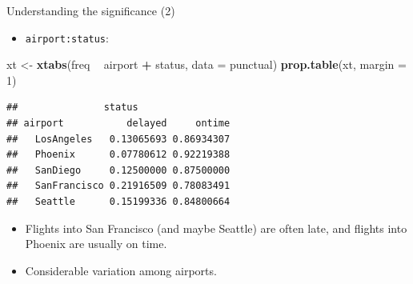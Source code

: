 \documentclass[
  ignorenonframetext,
]{beamer}
\newenvironment{Shaded}{\begin{snugshade}}{\end{snugshade}}
\newcommand{\DataTypeTok}[1]{\textcolor[rgb]{0.13,0.29,0.53}{#1}}
\newcommand{\DecValTok}[1]{\textcolor[rgb]{0.00,0.00,0.81}{#1}}
\newcommand{\KeywordTok}[1]{\textcolor[rgb]{0.13,0.29,0.53}{\textbf{#1}}}
\newcommand{\NormalTok}[1]{#1}
\newcommand{\OperatorTok}[1]{\textcolor[rgb]{0.81,0.36,0.00}{\textbf{#1}}}
\newcommand{\StringTok}[1]{\textcolor[rgb]{0.31,0.60,0.02}{#1}}
\providecommand{\tightlist}{%
  \setlength{\itemsep}{0pt}\setlength{\parskip}{0pt}}
\begin{document}
\begin{frame}[fragile]{Understanding the significance (2)}
\protect\hypertarget{understanding-the-significance-2}{}

\begin{itemize}
\tightlist
\item
  \texttt{airport:status}:
\end{itemize}

\begin{Shaded}
\begin{Highlighting}[]
\NormalTok{xt <-}\StringTok{ }\KeywordTok{xtabs}\NormalTok{(freq }\OperatorTok{~}\StringTok{ }\NormalTok{airport }\OperatorTok{+}\StringTok{ }\NormalTok{status, }\DataTypeTok{data =}\NormalTok{ punctual)}
\KeywordTok{prop.table}\NormalTok{(xt, }\DataTypeTok{margin =} \DecValTok{1}\NormalTok{)}
\end{Highlighting}
\end{Shaded}

\begin{verbatim}
##               status
## airport           delayed     ontime
##   LosAngeles   0.13065693 0.86934307
##   Phoenix      0.07780612 0.92219388
##   SanDiego     0.12500000 0.87500000
##   SanFrancisco 0.21916509 0.78083491
##   Seattle      0.15199336 0.84800664
\end{verbatim}

\begin{itemize}
\item
  Flights into San Francisco (and maybe Seattle) are often late, and
  flights into Phoenix are usually on time.
\item
  Considerable variation among airports.
\end{itemize}

\end{frame}
\end{document}
